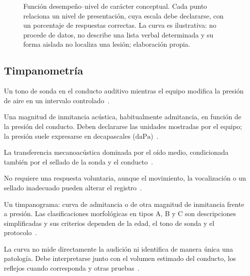 \begin{figure}[htbp]
    \centering
    
    \caption{Función desempeño--nivel de carácter conceptual. Cada punto
    relaciona un nivel de presentación, cuya escala debe declararse, con un
    porcentaje de respuestas correctas. La curva es ilustrativa: no procede
    de datos, no describe una lista verbal determinada y su forma aislada no
    localiza una lesión; elaboración propia.}
    \label{fig:u8-curva-logoaudiometrica}
\end{figure}

\subsection{Timpanometría}
\label{sec:u8-timpanometria}

\begin{description}[style=nextline]
    \item[Estímulo.]
    Un tono de sonda en el conducto auditivo mientras el equipo
    modifica la presión de aire en un intervalo controlado~\cite{ashaHearingAdults}.

    \item[Magnitud registrada.]
    Una magnitud de inmitancia acústica, habitualmente admitancia, en función
    de la presión del conducto. Deben declararse las unidades mostradas por el
    equipo; la presión suele expresarse en decapascales
    (\(\mathrm{daPa}\))~\cite{ashaHearingAdults}.

    \item[Parte del sistema evaluada.]
    La transferencia mecanoacústica dominada por el oído medio,
    condicionada también por el sellado de la sonda y el conducto~\cite{ashaHearingAdults}.

    \item[Respuesta conductual.]
    No requiere una respuesta voluntaria, aunque el movimiento, la
    vocalización o un sellado inadecuado pueden alterar el registro~\cite{ashaHearingAdults}.

    \item[Resultado básico esperado.]
    Un timpanograma: curva de admitancia o de otra magnitud de
    inmitancia frente a presión. Las clasificaciones morfológicas en tipos A, B
    y C son descripciones simplificadas y sus criterios dependen de la edad,
    el tono de sonda y el protocolo~\cite{ashaHearingAdults}.

    \item[Limitaciones generales.]
    La curva no mide directamente la audición ni identifica de manera única
    una patología. Debe interpretarse junto con el volumen estimado del
    conducto, los reflejos cuando corresponda y otras pruebas~\cite{ashaHearingAdults}.
\end{description}


